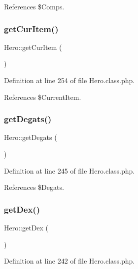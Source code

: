 References \$\+Comps.

\mbox{\label{class_hero_a3a76dca85e9913045d3f197e05b39d2c}} 
\subsubsection{\texorpdfstring{get\+Cur\+Item()}{getCurItem()}}
{\footnotesize\ttfamily Hero\+::get\+Cur\+Item (\begin{DoxyParamCaption}{ }\end{DoxyParamCaption})}



Definition at line 254 of file Hero.\+class.\+php.



References \$\+Current\+Item.

\mbox{\label{class_hero_ab432f72a5bfae4106b1d12db5db042c5}} 
\subsubsection{\texorpdfstring{get\+Degats()}{getDegats()}}
{\footnotesize\ttfamily Hero\+::get\+Degats (\begin{DoxyParamCaption}{ }\end{DoxyParamCaption})}



Definition at line 245 of file Hero.\+class.\+php.



References \$\+Degats.

\mbox{\label{class_hero_a1af6036f21efc21389f54721f88819da}} 
\subsubsection{\texorpdfstring{get\+Dex()}{getDex()}}
{\footnotesize\ttfamily Hero\+::get\+Dex (\begin{DoxyParamCaption}{ }\end{DoxyParamCaption})}



Definition at line 242 of file Hero.\+class.\+php.



